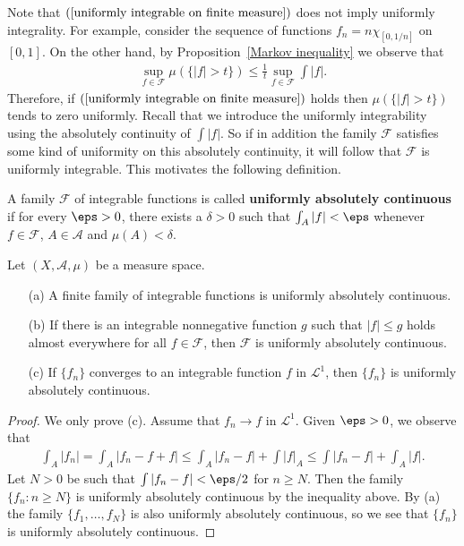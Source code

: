 Note that $(\ref{uniformly integrable on finite measure})$ does not imply uniformly integrality. For example, consider the sequence of functions $f_n=n\chi_{[0,1/n]}$ on $[0,1]$. On the other hand, by Proposition~\ref{Markov inequality} we observe that
\begin{align}\label{L^1 bounded then mu(|f|>t) uniformly zero}
\sup_{f\in\mathscr{F}}\mu(\{|f|>t\})\leq\frac{1}{t}\sup_{f\in\mathscr{F}}\int|f|.
\end{align}
Therefore, if $(\ref{uniformly integrable on finite measure})$ holds then $\mu(\{|f|>t\})$ tends to zero uniformly. Recall that we introduce the uniformly integrability using the absolutely continuity of $\int|f|$. So if in addition the family $\mathscr{F}$ satisfies some kind of uniformity on this absolutely continuity, it will follow that $\mathscr{F}$ is uniformly integrable. This motivates the following definition.
\begin{definition}
A family $\mathscr{F}$ of integrable functions is called \textbf{uniformly absolutely continuous} if for every $\eps>0$, there exists a $\delta>0$ such that $\int_{A}|f|<\eps$ whenever $f\in\mathscr{F}$, $A\in\mathcal{A}$ and $\mu(A)<\delta$.
\end{definition}
\begin{proposition}\label{uniformly absolutely continuous prop}
Let $(X,\mathcal{A},\mu)$ be a measure space.
\begin{itemize}
\item[(a)] A finite family of integrable functions is uniformly absolutely continuous.
\item[(b)] If there is an integrable nonnegative function $g$ such that $|f|\leq g$ holds almost everywhere for all $f\in\mathscr{F}$, then $\mathscr{F}$ is uniformly absolutely continuous.
\item[(c)] If $\{f_n\}$ converges to an integrable function $f$ in $\mathcal{L}^1$, then $\{f_n\}$ is uniformly absolutely continuous.
\end{itemize}
\end{proposition}
\begin{proof}
We only prove (c). Assume that $f_n\to f$ in $\mathcal{L}^1$. Given $\eps>0$, we observe that
\begin{align*}
\int_A|f_n|=\int_A|f_n-f+f|\leq\int_A|f_n-f|+\int|f|_A\leq\int|f_n-f|+\int_A|f|.
\end{align*}
Let $N>0$ be such that $\int|f_n-f|<\eps/2$ for $n\geq N$. Then the family $\{f_{n}:n\geq N\}$ is uniformly absolutely continuous by the inequality above. By (a) the family $\{f_1,\dots,f_N\}$ is also uniformly absolutely continuous, so we see that $\{f_n\}$ is uniformly absolutely continuous.
\end{proof}
